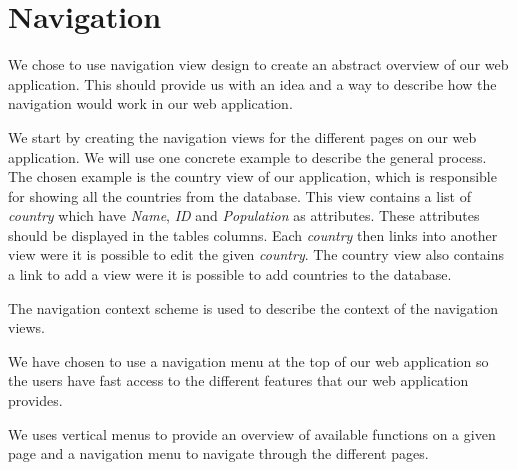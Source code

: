 \section{Navigation}
We chose to use navigation view design to create an abstract overview of our web application. This should provide us with an idea and a way to describe how the navigation would work in our web application.

We start by creating the navigation views for the different pages on our web application. We will use one concrete example to describe the general process. The chosen example is the country view of our application, which is responsible for showing all the countries from the database. This view contains a list of \textit{country} which have \textit{Name}, \textit{ID} and \textit{Population} as attributes. These attributes should be displayed in the tables columns. Each \textit{country} then links into another view were it is possible to edit the given \textit{country}. The country view also contains a link to add a view were it is possible to add countries to the database.

The navigation context scheme is used to describe the context of the navigation views.

We have chosen to use a navigation menu at the top of our web application so the users have fast access to the different features that our web application provides.

We uses vertical menus to provide an overview of available functions on a given page and a navigation menu to navigate through the different pages.